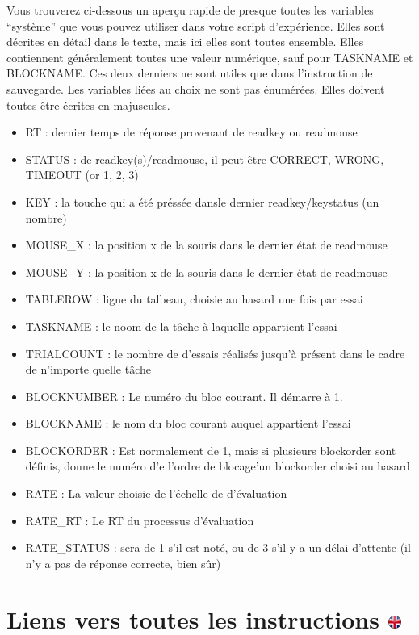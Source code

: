 \documentclass[
]{book}
\providecommand{\tightlist}{%
  \setlength{\itemsep}{0pt}\setlength{\parskip}{0pt}}
\begin{document}
Vous trouverez ci-dessous un aperçu rapide de presque toutes les variables ``système'' que vous pouvez utiliser dans votre script d'expérience. Elles sont décrites en détail dans le texte, mais ici elles sont toutes ensemble. Elles contiennent généralement toutes une valeur numérique, sauf pour TASKNAME et BLOCKNAME. Ces deux derniers ne sont utiles que dans l'instruction de sauvegarde. Les variables liées au choix ne sont pas énumérées. Elles doivent toutes être écrites en majuscules.

\begin{itemize}
\tightlist
\item
  RT : dernier temps de réponse provenant de readkey ou readmouse
\item
  STATUS : de readkey(s)/readmouse, il peut être CORRECT, WRONG, TIMEOUT (or 1, 2, 3)
\item
  KEY : la touche qui a été préssée dansle dernier readkey/keystatus (un nombre)
\item
  MOUSE\_X : la position x de la souris dans le dernier état de readmouse
\item
  MOUSE\_Y : la position x de la souris dans le dernier état de readmouse
\item
  TABLEROW : ligne du talbeau, choisie au hasard une fois par essai
\item
  TASKNAME : le noom de la tâche à laquelle appartient l'essai
\item
  TRIALCOUNT : le nombre de d'essais réalisés jusqu'à présent dans le cadre de n'importe quelle tâche
\item
  BLOCKNUMBER : Le numéro du bloc courant. Il démarre à 1.
\item
  BLOCKNAME : le nom du bloc courant auquel appartient l'essai
\item
  BLOCKORDER : Est normalement de 1, mais si plusieurs blockorder sont définis, donne le numéro d'e l'ordre de blocage'un blockorder choisi au hasard
\item
  RATE : La valeur choisie de l'échelle de d'évaluation
\item
  RATE\_RT : Le RT du processus d'évaluation
\item
  RATE\_STATUS : sera de 1 s'il est noté, ou de 3 s'il y a un délai d'attente (il n'y a pas de réponse correcte, bien sûr)
\end{itemize}

\hypertarget{liens-vers-toutes-les-instructions}{%
\section[Liens vers toutes les instructions ]{\texorpdfstring{Liens vers toutes les instructions \href{https://www.psytoolkit.org/doc3.2.0/syntax.html\#overview}{\protect\includegraphics{img/ukflag.png}}}{Liens vers toutes les instructions }}\label{liens-vers-toutes-les-instructions}}
\end{document}
